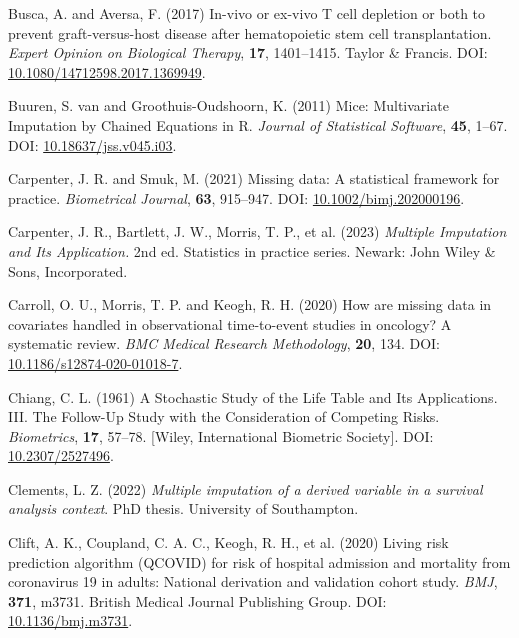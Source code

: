 \documentclass[
  letterpaper,
  DIV=11,
  numbers=noendperiod]{scrreprt}
\newlength{\cslhangindent}
\newenvironment{CSLReferences}[2] %
 {\begin{list}{}{%
  \setlength{\itemindent}{0pt}
  \setlength{\leftmargin}{0pt}
  \setlength{\parsep}{0pt}
  \ifodd #1
   \setlength{\leftmargin}{\cslhangindent}
   \setlength{\itemindent}{-1\cslhangindent}
  \fi
  \setlength{\itemsep}{#2\baselineskip}}}
 {\end{list}}
\begin{document}
\begin{CSLReferences}{1}{1}
Busca, A. and Aversa, F. (2017) In-vivo or ex-vivo {T} cell depletion or
both to prevent graft-versus-host disease after hematopoietic stem cell
transplantation. \emph{Expert Opinion on Biological Therapy},
\textbf{17}, 1401--1415. Taylor \& Francis. DOI:
\href{https://doi.org/10.1080/14712598.2017.1369949}{10.1080/14712598.2017.1369949}.

Buuren, S. van and Groothuis-Oudshoorn, K. (2011) Mice: {Multivariate
Imputation} by {Chained Equations} in {R}. \emph{Journal of Statistical
Software}, \textbf{45}, 1--67. DOI:
\href{https://doi.org/10.18637/jss.v045.i03}{10.18637/jss.v045.i03}.

Carpenter, J. R. and Smuk, M. (2021) Missing data: {A} statistical
framework for practice. \emph{Biometrical Journal}, \textbf{63},
915--947. DOI:
\href{https://doi.org/10.1002/bimj.202000196}{10.1002/bimj.202000196}.

Carpenter, J. R., Bartlett, J. W., Morris, T. P., et al. (2023)
\emph{Multiple Imputation and Its Application.} 2nd ed. Statistics in
practice series. Newark: John Wiley \& Sons, Incorporated.

Carroll, O. U., Morris, T. P. and Keogh, R. H. (2020) How are missing
data in covariates handled in observational time-to-event studies in
oncology? {A} systematic review. \emph{BMC Medical Research
Methodology}, \textbf{20}, 134. DOI:
\href{https://doi.org/10.1186/s12874-020-01018-7}{10.1186/s12874-020-01018-7}.

Chiang, C. L. (1961) A {Stochastic Study} of the {Life Table} and {Its
Applications}. {III}. {The Follow-Up Study} with the {Consideration} of
{Competing Risks}. \emph{Biometrics}, \textbf{17}, 57--78. {[}Wiley,
International Biometric Society{]}. DOI:
\href{https://doi.org/10.2307/2527496}{10.2307/2527496}.

Clements, L. Z. (2022) \emph{Multiple imputation of a derived variable
in a survival analysis context}. PhD thesis. University of Southampton.

Clift, A. K., Coupland, C. A. C., Keogh, R. H., et al. (2020) Living
risk prediction algorithm ({QCOVID}) for risk of hospital admission and
mortality from coronavirus 19 in adults: National derivation and
validation cohort study. \emph{BMJ}, \textbf{371}, m3731. British
Medical Journal Publishing Group. DOI:
\href{https://doi.org/10.1136/bmj.m3731}{10.1136/bmj.m3731}.


\end{CSLReferences}
\end{document}
